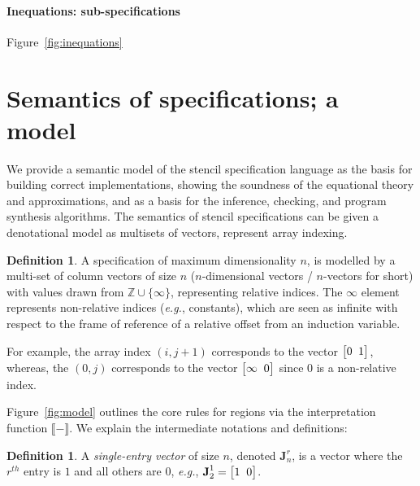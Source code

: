 \documentclass[9pt]{sigplanconf}
\newcounter{block}
\theoremstyle{definition}
\newtheorem{definition}[block]{Definition}
\newcommand{\eg}{\emph{e.g.}}
\newcommand{\interp}[1]{\llbracket{#1}\rrbracket}
\newcommand{\vtwoh}[2]{\setlength{\arraycolsep}{0em}
\left[\begin{array}{cc}#1 \; & \; #2\end{array}\right]}
\newcommand{\singleEntry}[2]{\textbf{J}_{#2}^{#1}}
\begin{document}
\paragraph{Inequations: sub-specifications}

Figure~\ref{fig:inequations} 

\section{Semantics of specifications; a model}
\label{sec:semantics}

\newcommand{\relix}{(\mathbb{Z}_\bot)^\mathbb{D}}

We provide a semantic model of the stencil specification language as
the basis for building correct implementations, showing the soundness
of the equational theory and approximations, and as a basis for the
inference, checking, and program synthesis algorithms.
The semantics of stencil specifications can be given a denotational
model as multisets of vectors, represent array indexing.

\begin{definition}
  A specification of maximum dimensionality $n$, is modelled by a
  multi-set of column vectors of size $n$  ($n$-dimensional vectors /
  $n$-vectors for short)
  with values drawn from $\mathbb{Z} \cup \{\infty\}$, representing
  relative indices. The $\infty$ element represents non-relative
  indices (\eg{}, constants), which are seen as infinite with respect
  to the frame of reference of a relative offset from an induction
  variable.

  For example, the array index $(i, j+1)$ corresponds to the vector
  $\vtwoh{0}{1}$, whereas, the $(0, j)$ corresponds to the
  vector $\vtwoh{\infty}{0}$ since $0$ is a non-relative index. 
\end{definition}
 
Figure~\ref{fig:model} outlines the core rules for regions
via the interpretation function $\interp{-}$.  We explain the
intermediate notations and definitions:

\begin{definition}A \emph{single-entry vector} of size $n$, denoted 
$\singleEntry{r}{n}$, is a vector 
where the $r^{th}$ entry is $1$ and all others are $0$, \eg{},
$\singleEntry{1}{2} = \vtwoh{1}{0}$.
\end{definition}
\end{document}
